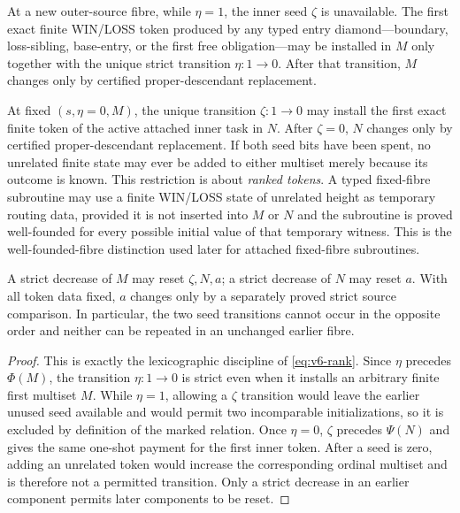 \begin{lemma}\label{lem:seed-policy}
At a new outer-source fibre, while $\eta=1$, the inner seed $\zeta$ is
unavailable.  The first exact finite WIN/LOSS token produced by any typed
entry diamond---boundary, loss-sibling, base-entry, or the first free
obligation---may be installed in $M$ only together with the unique strict
transition $\eta:1\to0$.  After that transition, $M$ changes only by
certified proper-descendant replacement.

At fixed $(s,\eta=0,M)$, the unique transition $\zeta:1\to0$ may install the
first exact finite token of the active attached inner task in $N$.  After
$\zeta=0$, $N$ changes only by certified proper-descendant replacement.  If
both seed bits have been spent, no unrelated finite state may ever be added
to either multiset merely because its outcome is known.  This restriction is
about \emph{ranked tokens}.  A typed fixed-fibre subroutine may use a finite
WIN/LOSS state of unrelated height as temporary routing data, provided it is
not inserted into $M$ or $N$ and the subroutine is proved well-founded for
every possible initial value of that temporary witness.  This is the well-founded-fibre distinction used later for attached fixed-fibre subroutines.

A strict decrease of $M$ may reset $\zeta,N,a$; a strict decrease of $N$ may
reset $a$.  With all token data fixed, $a$ changes only by a separately
proved strict source comparison.  In particular, the two seed transitions
cannot occur in the opposite order and neither can be repeated in an
unchanged earlier fibre.
\end{lemma}

\begin{proof}
This is exactly the lexicographic discipline of \eqref{eq:v6-rank}.  Since
$\eta$ precedes $\Phi(M)$, the transition $\eta:1\to0$ is strict even when it
installs an arbitrary finite first multiset $M$.  While $\eta=1$, allowing a
$\zeta$ transition would leave the earlier unused seed available and would
permit two incomparable initializations, so it is excluded by definition of
the marked relation.  Once $\eta=0$, $\zeta$ precedes $\Psi(N)$ and gives the
same one-shot payment for the first inner token.  After a seed is zero, adding
an unrelated token would increase the corresponding ordinal multiset and is
therefore not a permitted transition.  Only a strict decrease in an earlier
component permits later components to be reset.
\end{proof}

